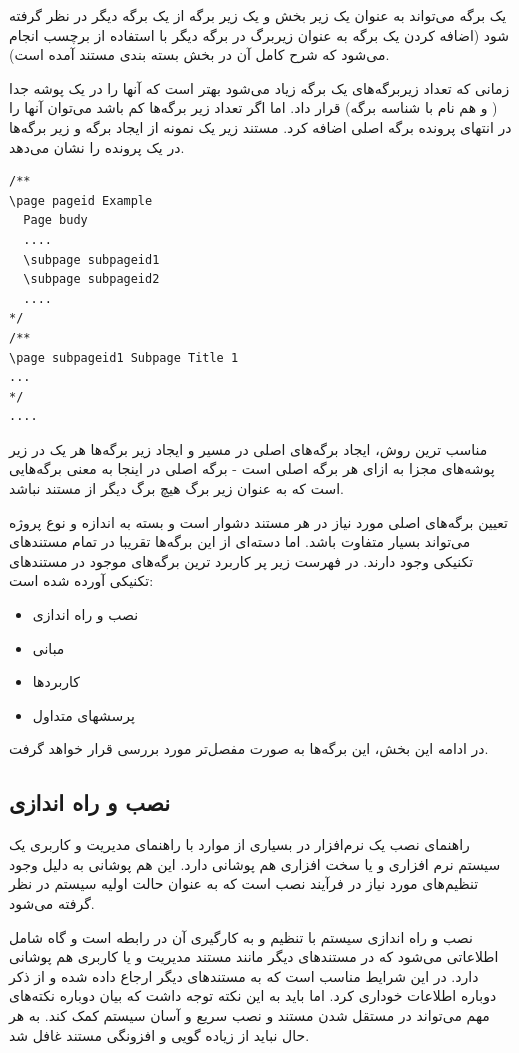   یک برگه می‌تواند به عنوان یک زیر بخش و یک زیر برگه از یک برگه دیگر در نظر
  گرفته شود (اضافه کردن یک برگه به عنوان زیربرگ در برگه دیگر با استفاده از برچسب
   انجام می‌شود که شرح کامل آن در بخش بسته بندی مستند آمده است).

  زمانی که تعداد زیربرگه‌های یک برگه زیاد می‌شود بهتر است که آنها را در یک پوشه
  جدا ( و هم نام با شناسه برگه) قرار داد. اما اگر تعداد زیر برگه‌ها کم باشد
  می‌توان آنها را در انتهای پرونده برگه اصلی اضافه کرد. مستند زیر یک نمونه از
  ایجاد برگه و زیر برگه‌ها در یک پرونده را نشان می‌دهد.

\begin{latin}
\lstset{language=C++}
\begin{lstlisting}[frame=single]
/**
\page pageid Example
  Page budy
  ....
  \subpage subpageid1
  \subpage subpageid2
  ....
*/
/**
\page subpageid1 Subpage Title 1
...
*/
....
\end{lstlisting}
\end{latin}

  مناسب ترین روش، ایجاد برگه‌های اصلی در مسیر  و ایجاد زیر برگه‌ها هر یک در زیر
  پوشه‌های مجزا به ازای هر برگه اصلی است - برگه اصلی در اینجا به معنی برگه‌هایی
  است که به عنوان زیر برگ هیچ برگ دیگر از مستند نباشد.

  تعیین برگه‌های اصلی مورد نیاز در هر مستند دشوار است و بسته به اندازه و نوع
  پروژه می‌تواند بسیار متفاوت باشد. اما دسته‌ای از این برگه‌ها
  تقریبا در تمام مستندهای تکنیکی وجود دارند.
  در فهرست زیر پر کاربرد ترین برگه‌های موجود در مستندهای تکنیکی آورده شده است:
  \begin{itemize}
   \item نصب و راه اندازی
   \item مبانی
   \item کاربردها
   \item پرسشهای متداول
  \end{itemize}
  در ادامه این بخش، این برگه‌ها به صورت مفصل‌تر مورد بررسی قرار  خواهد گرفت.

  
  
\subsection{نصب و راه اندازی}
  راهنمای نصب یک نرم‌افزار در بسیاری از موارد با راهنمای مدیریت و کاربری یک
  سیستم نرم افزاری و یا سخت افزاری هم پوشانی دارد. این هم پوشانی به دلیل وجود
  تنظیم‌های مورد نیاز در فرآیند نصب است که به عنوان حالت اولیه سیستم در نظر
  گرفته می‌شود.

  نصب و راه اندازی سیستم با تنظیم و به کارگیری آن در رابطه است و
  گاه شامل اطلاعاتی می‌شود که در مستندهای دیگر مانند مستند مدیریت و یا کاربری 
  هم پوشانی دارد. در این شرایط مناسب است که به مستندهای دیگر ارجاع داده شده و از
  ذکر دوباره اطلاعات خوداری کرد. اما باید به این نکته توجه داشت که بیان دوباره
  نکته‌های مهم می‌تواند در مستقل شدن مستند و نصب سریع و آسان سیستم کمک کند. به
  هر حال نباید از زیاده گویی و افزونگی مستند غافل شد.

